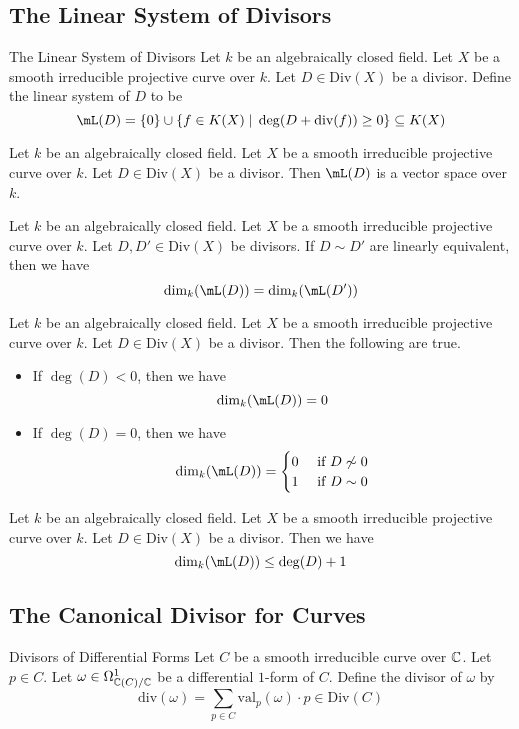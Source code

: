 \documentclass[a4paper]{article}
\begin{document}
\subsection{The Linear System of Divisors}
\begin{defn}{The Linear System of Divisors}{} Let $k$ be an algebraically closed field. Let $X$ be a smooth irreducible projective curve over $k$. Let $D\in\text{Div}(X)$ be a divisor. Define the linear system of $D$ to be $$\mL(D)=\{0\}\cup\{f\in K(X)\;|\;\deg(D+\text{div}(f))\geq 0\}\subseteq K(X)$$
\end{defn}

\begin{lmm}{}{} Let $k$ be an algebraically closed field. Let $X$ be a smooth irreducible projective curve over $k$. Let $D\in\text{Div}(X)$ be a divisor. Then $\mL(D)$ is a vector space over $k$. 
\end{lmm}

\begin{prp}{}{} Let $k$ be an algebraically closed field. Let $X$ be a smooth irreducible projective curve over $k$. Let $D,D'\in\text{Div}(X)$ be divisors. If $D\sim D'$ are linearly equivalent, then we have $$\dim_k(\mL(D))=\dim_k(\mL(D'))$$
\end{prp}

\begin{prp}{}{} Let $k$ be an algebraically closed field. Let $X$ be a smooth irreducible projective curve over $k$. Let $D\in\text{Div}(X)$ be a divisor. Then the following are true. 
\begin{itemize}
\item If $\deg(D)<0$, then we have $$\dim_k(\mL(D))=0$$
\item If $\deg(D)=0$, then we have $$\dim_k(\mL(D))=\begin{cases}
0 & \text{ if }D\not\sim0\\
1 & \text{ if }D\sim 0
\end{cases}$$
\end{itemize}
\end{prp}

\begin{prp}{}{} Let $k$ be an algebraically closed field. Let $X$ be a smooth irreducible projective curve over $k$. Let $D\in\text{Div}(X)$ be a divisor. Then we have $$\dim_k(\mL(D))\leq\deg(D)+1$$
\end{prp}

\subsection{The Canonical Divisor for Curves}
\begin{defn}{Divisors of Differential Forms}{} Let $C$ be a smooth irreducible curve over $\mathbb{C}$. Let $p\in C$. Let $\omega\in\Omega_{\mathbb{C}(C)/\mathbb{C}}^1$ be a differential $1$-form of $C$. Define the divisor of $\omega$ by $$\text{div}(\omega)=\sum_{p\in C}\text{val}_p(\omega)\cdot p\in\text{Div}(C)$$
\end{defn}
\end{document}

